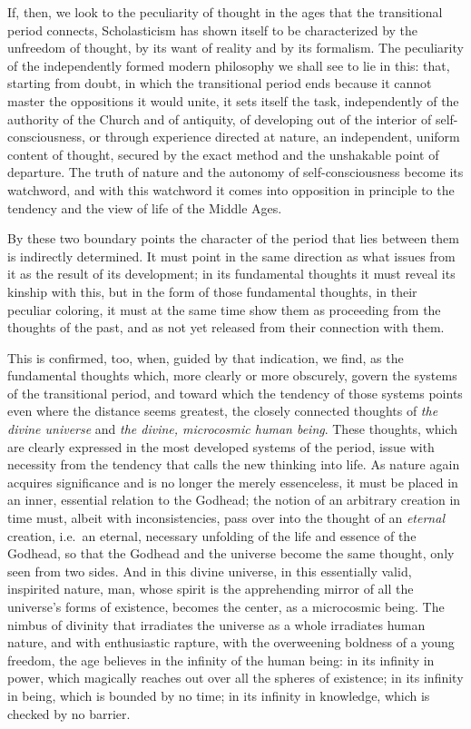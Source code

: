 If, then, we look to the peculiarity of thought in the ages that the
transitional period connects, Scholasticism has shown itself to be
characterized by the unfreedom of thought, by its want of reality and
by its formalism. The peculiarity of the independently formed modern
philosophy we shall see to lie in this: that, starting from doubt, in
which the transitional period ends because it cannot master the
oppositions it would unite, it sets itself the task, independently of
the authority of the Church and of antiquity, of developing out of the
interior of self-consciousness, or through experience directed at
nature, an independent, uniform content of thought, secured by the
exact method and the unshakable point of departure. The truth of
nature and the autonomy of self-consciousness become its watchword,
and with this watchword it comes into opposition in principle to the
tendency and the view of life of the Middle Ages.

By these two boundary points the character of the period that lies
between them is indirectly determined. It must point in the same
direction as what issues from it as the result of its development; in
its fundamental thoughts it must reveal its kinship with this, but in
the form of those fundamental thoughts, in their peculiar coloring, it
must at the same time show them as proceeding from the thoughts of the
past, and as not yet released from their connection with them.

This is confirmed, too, when, guided by that indication, we find, as
the fundamental thoughts which, more clearly or more obscurely, govern
the systems of the transitional period, and toward which the tendency
of those systems points even where the distance seems greatest, the
closely connected thoughts of \emph{the divine universe} and \emph{the
divine, microcosmic human being}. These thoughts, which are clearly
expressed in the most developed systems of the period, issue with
necessity from the tendency that calls the new thinking into life. As
nature again acquires significance and is no longer the merely
essenceless, it must be placed in an inner, essential relation
to the Godhead; the notion of an arbitrary creation in time must,
albeit with inconsistencies, pass over into the thought of an
\emph{eternal} creation, i.e.\ an eternal, necessary unfolding of the
life and essence of the Godhead, so that the Godhead and the universe
become the same thought, only seen from two sides. And in this divine
universe, in this essentially valid, inspirited nature, man, whose
spirit is the apprehending mirror of all the universe's forms of
existence, becomes the center, as a microcosmic being. The nimbus of
divinity that irradiates the universe as a whole irradiates human
nature, and with enthusiastic rapture, with the overweening boldness
of a young freedom, the age believes in the infinity of the human
being: in its infinity in power, which magically reaches out over all
the spheres of existence; in its infinity in being, which is bounded
by no time; in its infinity in knowledge, which is checked by no
barrier.

